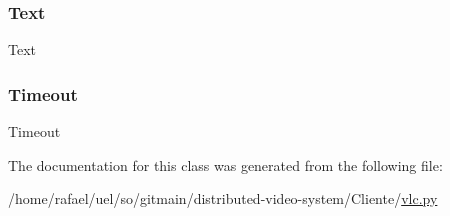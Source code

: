 \subsubsection{\texorpdfstring{Text}{Text}}
{\footnotesize\ttfamily Text\hspace{0.3cm}{\ttfamily [static]}}

\mbox{\label{classvlc_1_1_video_marquee_option_ac9bae762fa8503eb566f9f0c1df369d6}} 
\subsubsection{\texorpdfstring{Timeout}{Timeout}}
{\footnotesize\ttfamily Timeout\hspace{0.3cm}{\ttfamily [static]}}



The documentation for this class was generated from the following file\+:\begin{DoxyCompactItemize}
\item 
/home/rafael/uel/so/gitmain/distributed-\/video-\/system/\+Cliente/\hyperlink{vlc_8py}{vlc.\+py}\end{DoxyCompactItemize}
